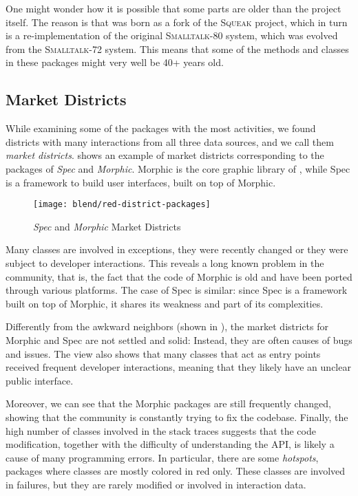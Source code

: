 One might wonder how it is possible that some parts are older than the \pha project itself.
The reason is that \pha was born as a fork of the \textsc{Squeak} project, which in turn is a re-implementation of the original \textsc{Smalltalk-80} system, which was evolved from the \textsc{Smalltalk-72} system.
This means that some of the methods and classes in these packages might very well be 40+ years old.

\subsection{Market Districts}

While examining some of the packages with the most activities, we found districts with many interactions from all three data sources, and we call them \emph{market districts}.
 shows an example of market districts corresponding to the packages of \textit{Spec} and \textit{Morphic}.
Morphic is the core graphic library of \pha, while Spec is a framework to build user interfaces, built on top of Morphic.

\begin{figure}[ht]
\centering
\texttt{[image: blend/red-district-packages]}
\caption{\textit{Spec} and \textit{Morphic} Market Districts}
\label{fig:market-districts}
\end{figure}

Many classes are involved in exceptions, they were recently changed or they were subject to developer interactions.
This reveals a long known problem in the community, that is, the fact that the code of Morphic is old and have been ported through various platforms.
 The case of Spec is similar: since Spec is a framework built on top of Morphic, it shares its weakness and part of its complexities.

Differently from the awkward neighbors (shown in ), the market districts for Morphic and Spec are not settled and solid: Instead, they are often causes of bugs and issues.
The view also shows that many classes that act as entry points received frequent developer interactions, meaning that they likely have an unclear public interface.

Moreover, we can see that the Morphic packages are still frequently changed, showing that the community is constantly trying to fix the codebase.
Finally, the high number of classes involved in the stack traces suggests that the code modification, together with the difficulty of understanding the API, is likely a cause of many programming errors.
In particular, there are some \emph{hotspots}, \ie packages where classes are mostly colored in red only.
These classes are involved in failures, but they are rarely modified or involved in interaction data.

